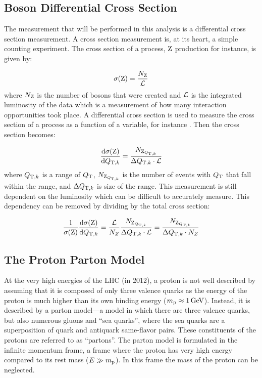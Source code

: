 \subsection{\texorpdfstring{\Z}{Z} Boson Differential Cross Section}

The measurement that will be performed in this analysis is a differential cross
section measurement. A cross section measurement is, at its heart, a simple
counting experiment. The cross section of a process, $\text{Z}$ production for
instance, is given by:

\begin{equation}\label{eq:xsec}
    \sigma(\text{Z}) = \frac{N_{\text{Z}}}{\mathcal{L}}
\end{equation}
%
where $N_{\text{Z}}$ is the number of \Z bosons that were created and $\mathcal{L}$
is the integrated luminosity of the data which is a measurement of how many
interaction opportunities took place. A differential cross section is used to
measure the cross section of a process as a function of a variable, for
instance \bosonpt. Then the cross section becomes:

\begin{equation}\label{eq:differ_xsec}
    \frac{\text{d}\sigma(\text{Z})}{\text{d}Q_{\mathrm{T},k} }
    =
    \frac{N_{\text{Z}_{Q_{\mathrm{T},k}}}}{\Delta Q_{\mathrm{T},k} \cdot \mathcal{L}}
\end{equation}
%
where $Q_{\mathrm{T},k}$ is a range of $Q_{\mathrm{T}}$, $N_{\text{Z}_{Q_{\mathrm{T},k}}}$ is the number
of \Z events with $Q_{\mathrm{T}}$ that fall within the range, and $\Delta Q_{\mathrm{T},k}$
is size of the range. This measurement is still dependent on the luminosity
which can be difficult to accurately measure. This dependency can be removed by
dividing by the total cross section:

\begin{equation}\label{eq:normaized_differ_xsec}
    \frac{1}{\sigma(\text{Z})} \frac{\text{d}\sigma(\text{Z})}{\text{d}Q_{\mathrm{T},k} }
    =
    \frac{\mathcal{L}}{N_{Z}} \frac{N_{\text{Z}_{Q_{\mathrm{T},k}}}}{\Delta Q_{\mathrm{T},k} \cdot \mathcal{L}}
    =
    \frac{N_{\text{Z}_{Q_{\mathrm{T},k}}}}{\Delta Q_{\mathrm{T},k} \cdot N_{Z}}
\end{equation}

\subsection{The Proton Parton Model}
\label{ssec:parton_model}

At the very high energies of the LHC (\rootseight in 2012), a proton is not
well described by assuming that it is composed of only three valence quarks as
the energy of the proton is much higher than its own binding energy
($\ProtonMass \approx \SI{1}{\GeV}$). Instead, it is described by a parton
model---a model in which there are three valence quarks, but also numerous
gluons and ``sea quarks'', where the sea quarks are a superposition of quark
and antiquark same-flavor pairs. These constituents of the protons are referred
to as ``partons''. The parton model is formulated in the infinite momentum
frame, a frame where the proton has very high energy compared to its rest mass
($E \gg m_{\text{p}}$). In this frame the mass of the proton can be
neglected.

